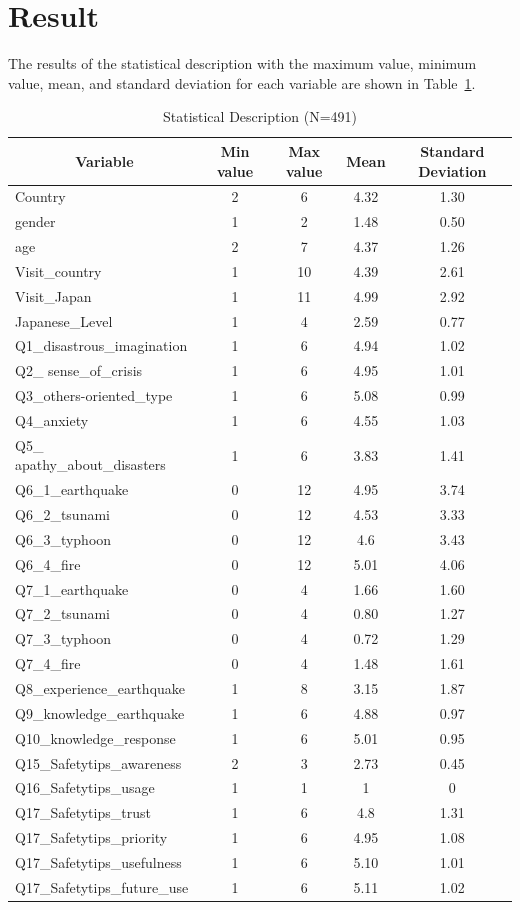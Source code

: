 \section{Result}
The results of the statistical description with the maximum value, minimum value, mean, and standard deviation for each variable are shown in Table~\ref{table27}.

\begin{table}[h]
  \caption[Statistical Description]{Statistical Description (N=491)}
  \label{table27}
  \centering
  \begin{tabular}{l|cccc}
 \hline
\multicolumn{1}{c|}{Variable} & Min value  & Max value & Mean & Standard Deviation \\
 \hline
Country	& 2&6&4.32&1.30\\
gender&1&2&1.48&0.50\\
age&2&7&4.37&1.26\\
Visit\_country&1&10&4.39&2.61\\
Visit\_Japan&1&11&4.99&2.92\\
Japanese\_Level&1&4&2.59&0.77\\
Q1\_disastrous\_imagination&1&6&4.94&1.02\\
Q2\_ sense\_of\_crisis&1&6&4.95&1.01\\
Q3\_others-oriented\_type&1&6&5.08&0.99\\
Q4\_anxiety&1&6&4.55&1.03\\
Q5\_ apathy\_about\_disasters&1&6&3.83&1.41\\
Q6\_1\_earthquake&0&12&4.95&3.74\\
Q6\_2\_tsunami&0&12&4.53&3.33\\
Q6\_3\_typhoon&0&12&4.6&3.43\\
Q6\_4\_fire&0&12&5.01&4.06\\
Q7\_1\_earthquake&0&4&1.66&1.60\\
Q7\_2\_tsunami&0&4&0.80&1.27\\
Q7\_3\_typhoon&0&4&0.72&1.29\\
Q7\_4\_fire&0&4&1.48&1.61\\
Q8\_experience\_earthquake&1&8&3.15& 1.87\\
Q9\_knowledge\_earthquake&1&6&4.88&0.97\\
Q10\_knowledge\_response&1&6&5.01&0.95\\
Q15\_Safetytips\_awareness&2&3&2.73&0.45\\
Q16\_Safetytips\_usage&1&1&1&0\\
Q17\_Safetytips\_trust&1&6&4.8&1.31\\
Q17\_Safetytips\_priority&1&6&4.95&1.08\\
Q17\_Safetytips\_usefulness&1&6&5.10&1.01\\
Q17\_Safetytips\_future\_use&1&6&5.11&1.02\\
 \hline
  \end{tabular}
\end{table}

